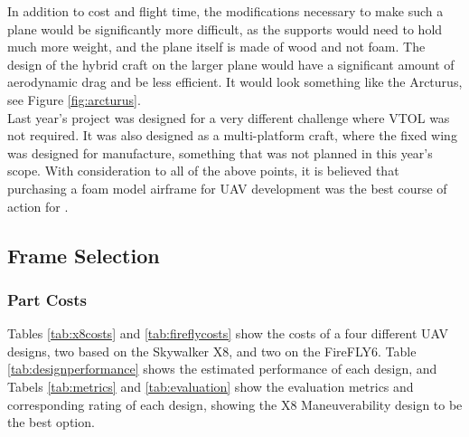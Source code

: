 In addition to cost and flight time, the modifications necessary to make such a plane would be significantly more difficult, as the supports would need to hold much more weight, and the plane itself is made of wood and not foam. The design of the hybrid craft on the larger plane would have a significant amount of aerodynamic drag and be less efficient. It would look something like the Arcturus, see Figure \ref{fig:arcturus}.\\
	
Last year's project was designed for a very different challenge where VTOL was not required. It was also designed as a multi-platform craft, where the fixed wing was designed for manufacture, something that was not planned in this year's scope. With consideration to all of the above points, it is believed that purchasing a foam model airframe for UAV development was the best course of action for \ID.

\subsection{Frame Selection}
\label{sec:selection}

\subsubsection*{Part Costs}
Tables \ref{tab:x8costs} and \ref{tab:fireflycosts} show the costs of a four different UAV designs, two based on the Skywalker X8, and two on the FireFLY6. Table \ref{tab:designperformance} shows the estimated performance of each design, and Tabels \ref{tab:metrics} and \ref{tab:evaluation} show the evaluation metrics and corresponding rating of each design, showing the X8 Maneuverability design to be the best option.

